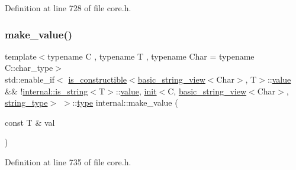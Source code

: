 Definition at line 728 of file core.\+h.

\mbox{\label{namespaceinternal_a9e2275f74beb9eaeea39e65d24311802}} 
\subsubsection{\texorpdfstring{make\+\_\+value()}{make\_value()}\hspace{0.1cm}{\footnotesize\ttfamily [5/8]}}
{\footnotesize\ttfamily template$<$typename C , typename T , typename Char  = typename C\+::char\+\_\+type$>$ \\
std\+::enable\+\_\+if$<$ \hyperlink{structis__constructible}{is\+\_\+constructible}$<$\hyperlink{classbasic__string__view}{basic\+\_\+string\+\_\+view}$<$Char$>$, T$>$\+::\hyperlink{classinternal_1_1value}{value} \&\& !\hyperlink{structinternal_1_1is__string}{internal\+::is\+\_\+string}$<$T$>$\+::\hyperlink{classinternal_1_1value}{value}, \hyperlink{structinternal_1_1init}{init}$<$C, \hyperlink{classbasic__string__view}{basic\+\_\+string\+\_\+view}$<$Char$>$, \hyperlink{namespaceinternal_a8661864098ac0acff9a6dd7e66f59038a8a104d760e6ea540da0d654ca8728d55}{string\+\_\+type}$>$ $>$\+::\hyperlink{namespaceinternal_a8661864098ac0acff9a6dd7e66f59038}{type} internal\+::make\+\_\+value (\begin{DoxyParamCaption}\item[{const T \&}]{val }\end{DoxyParamCaption})\hspace{0.3cm}{\ttfamily [inline]}}



Definition at line 735 of file core.\+h.

\mbox{\label{namespaceinternal_a61c7dd9f9c0883dd5a487ca563e632f4}} 
